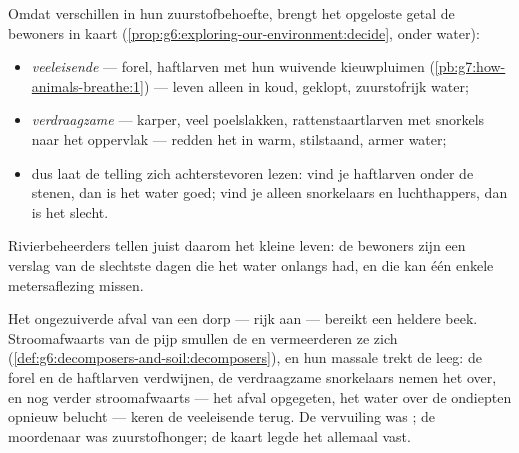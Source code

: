 \begin{proposition}\label{prop:g7:oxygen-in-the-water:map}
Omdat  verschillen in hun zuurstofbehoefte, brengt het opgeloste
getal de bewoners in kaart
(\cref{prop:g6:exploring-our-environment:decide}, onder water):
\begin{itemize}
  \item \emph{veeleisende}  --- forel, haftlarven met hun wuivende
        kieuwpluimen (\cref{pb:g7:how-animals-breathe:1}) --- leven
        alleen in koud, geklopt, zuurstofrijk water;
  \item \emph{verdraagzame}  --- karper, veel poelslakken,
        rattenstaartlarven met snorkels naar het oppervlak --- redden
        het in warm, stilstaand, armer water;
  \item dus laat de telling zich achterstevoren lezen: vind je haftlarven
        onder de stenen, dan is het water goed; vind je alleen snorkelaars
        en luchthappers, dan is het slecht.
\end{itemize}
Rivierbeheerders tellen juist daarom het kleine leven: de bewoners zijn
een verslag van de slechtste dagen die het water onlangs had, en die kan
één enkele metersaflezing missen.
\end{proposition}
\admitted

\begin{example}\label{ex:g7:oxygen-in-the-water:waste}
Het ongezuiverde afval van een dorp --- rijk aan  ---
bereikt een heldere beek. Stroomafwaarts van de pijp smullen de 
en vermeerderen ze zich
(\cref{def:g6:decomposers-and-soil:decomposers}), en hun massale
 trekt de  leeg: de forel en de haftlarven verdwijnen,
de verdraagzame snorkelaars nemen het over, en nog verder stroomafwaarts
--- het afval opgegeten, het water over de ondiepten opnieuw belucht ---
keren de veeleisende  terug. De vervuiling was ;
de moordenaar was zuurstofhonger; de kaart legde het allemaal vast.
\end{example}


